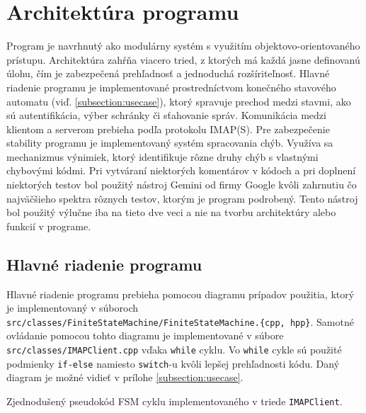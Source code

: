 \documentclass[a4paper, 11pt]{article}
\begin{document}
	\section{Architektúra programu}
	Program je navrhnutý ako modulárny systém s využitím objektovo-orientovaného prístupu. Architektúra zahŕňa viacero tried, z ktorých má každá jasne definovanú úlohu, čím je zabezpečená prehľadnosť a jednoduchá rozšíriteľnosť. Hlavné riadenie programu je implementované prostredníctvom konečného stavového automatu (viď. \ref{subsection:usecase}), ktorý spravuje prechod medzi stavmi, ako sú autentifikácia, výber schránky či sťahovanie správ.\newline
	Komunikácia medzi klientom a serverom prebieha podľa protokolu IMAP(S).\newline
	Pre zabezpečenie stability programu je implementovaný systém spracovania chýb. Využíva sa mechanizmus výnimiek, ktorý identifikuje rôzne druhy chýb s vlastnými  chybovými kódmi.\newline
	Pri vytváraní niektorých komentárov v kódoch a pri doplnení niektorých testov bol použitý nástroj Gemini od firmy Google kvôli zahrnutiu čo najväčšieho spektra rôznych testov, ktorým je program podrobený. Tento nástroj bol použitý výlučne iba na tieto dve veci a nie na tvorbu architektúry alebo funkcií v programe.

	\subsection{Hlavné riadenie programu}
	Hlavné riadenie programu prebieha pomocou diagramu prípadov použitia, ktorý je implementovaný v súboroch \texttt{src/classes/FiniteStateMachine/FiniteStateMachine.\{cpp, hpp\}}. Samotné ovládanie pomocou tohto diagramu je implementované v súbore \texttt{src/classes/IMAPClient.cpp} vďaka \texttt{while} cyklu. Vo \texttt{while} cykle sú použité podmienky \texttt{if-else} namiesto \texttt{switch}-u kvôli lepšej prehľadnosti kódu.\newline
	Daný diagram je možné vidieť v prílohe \ref{subsection:usecase}.
	\begin{algorithm}[ht]
		
		\caption{Zjednodušený pseudokód FSM cyklu implementovaného v triede \texttt{IMAPClient}.}
		\label{algorithm:fsm_loop_simple}
		\end{algorithm}
\end{document}
